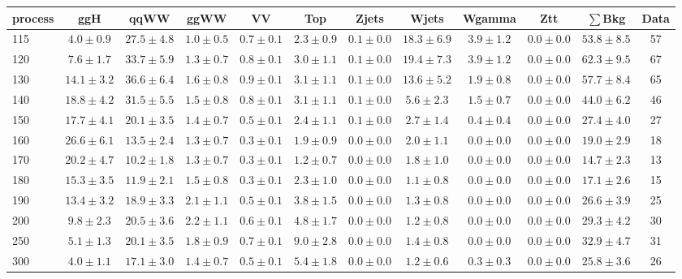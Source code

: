 \begin{table}
{\footnotesize
 \begin{center}
 \begin{tabular}{l c c c c c c c c c c c }
 \hline
 process & ggH & qqWW & ggWW & VV & Top & Zjets & Wjets & Wgamma & Ztt & $\sum$Bkg & Data \\
 \hline
115 & $4.0\pm0.9$ & $27.5\pm4.8$ & $1.0\pm0.5$ & $0.7\pm0.1$ & $2.3\pm0.9$ & $0.1\pm0.0$ & $18.3\pm6.9$ & $3.9\pm1.2$ & $0.0\pm0.0$ & $53.8\pm8.5$ & 57 \\
120 & $7.6\pm1.7$ & $33.7\pm5.9$ & $1.3\pm0.7$ & $0.8\pm0.1$ & $3.0\pm1.1$ & $0.1\pm0.0$ & $19.4\pm7.3$ & $3.9\pm1.2$ & $0.0\pm0.0$ & $62.3\pm9.5$ & 67 \\
130 & $14.1\pm3.2$ & $36.6\pm6.4$ & $1.6\pm0.8$ & $0.9\pm0.1$ & $3.1\pm1.1$ & $0.1\pm0.0$ & $13.6\pm5.2$ & $1.9\pm0.8$ & $0.0\pm0.0$ & $57.7\pm8.4$ & 65 \\
140 & $18.8\pm4.2$ & $31.5\pm5.5$ & $1.5\pm0.8$ & $0.8\pm0.1$ & $3.1\pm1.1$ & $0.1\pm0.0$ & $5.6\pm2.3$ & $1.5\pm0.7$ & $0.0\pm0.0$ & $44.0\pm6.2$ & 46 \\
150 & $17.7\pm4.1$ & $20.1\pm3.5$ & $1.4\pm0.7$ & $0.5\pm0.1$ & $2.4\pm1.1$ & $0.1\pm0.0$ & $2.7\pm1.4$ & $0.4\pm0.4$ & $0.0\pm0.0$ & $27.4\pm4.0$ & 27 \\
160 & $26.6\pm6.1$ & $13.5\pm2.4$ & $1.3\pm0.7$ & $0.3\pm0.1$ & $1.9\pm0.9$ & $0.0\pm0.0$ & $2.0\pm1.1$ & $0.0\pm0.0$ & $0.0\pm0.0$ & $19.0\pm2.9$ & 18 \\
170 & $20.2\pm4.7$ & $10.2\pm1.8$ & $1.3\pm0.7$ & $0.3\pm0.1$ & $1.2\pm0.7$ & $0.0\pm0.0$ & $1.8\pm1.0$ & $0.0\pm0.0$ & $0.0\pm0.0$ & $14.7\pm2.3$ & 13 \\
180 & $15.3\pm3.5$ & $11.9\pm2.1$ & $1.5\pm0.8$ & $0.3\pm0.1$ & $2.3\pm1.0$ & $0.0\pm0.0$ & $1.1\pm0.8$ & $0.0\pm0.0$ & $0.0\pm0.0$ & $17.1\pm2.6$ & 15 \\
190 & $13.4\pm3.2$ & $18.9\pm3.3$ & $2.1\pm1.1$ & $0.5\pm0.1$ & $3.8\pm1.5$ & $0.0\pm0.0$ & $1.3\pm0.8$ & $0.0\pm0.0$ & $0.0\pm0.0$ & $26.6\pm3.9$ & 25 \\
200 & $9.8\pm2.3$ & $20.5\pm3.6$ & $2.2\pm1.1$ & $0.6\pm0.1$ & $4.8\pm1.7$ & $0.0\pm0.0$ & $1.2\pm0.8$ & $0.0\pm0.0$ & $0.0\pm0.0$ & $29.3\pm4.2$ & 30 \\
250 & $5.1\pm1.3$ & $20.1\pm3.5$ & $1.8\pm0.9$ & $0.7\pm0.1$ & $9.0\pm2.8$ & $0.0\pm0.0$ & $1.4\pm0.8$ & $0.0\pm0.0$ & $0.0\pm0.0$ & $32.9\pm4.7$ & 31 \\
300 & $4.0\pm1.1$ & $17.1\pm3.0$ & $1.4\pm0.7$ & $0.5\pm0.1$ & $5.4\pm1.8$ & $0.0\pm0.0$ & $1.2\pm0.6$ & $0.3\pm0.3$ & $0.0\pm0.0$ & $25.8\pm3.6$ & 26 \\

\end{tabular}
\end{center}}
\end{table}
